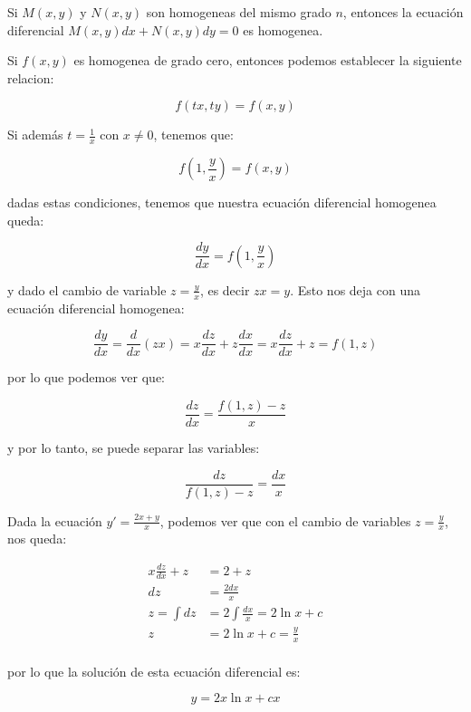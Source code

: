 		\begin{proposicion}
			Si $M(x, y)$ y $N(x, y)$ son homogeneas del mismo grado $n$, entonces la ecuación diferencial $M(x, y) dx + N(x, y) dy = 0$ es homogenea.
		\end{proposicion}

		\begin{proposicion}
			Si $f(x, y)$ es homogenea de grado cero, entonces podemos establecer la siguiente relacion:

			\begin{equation}
				f(tx, ty) = f(x, y)
			\end{equation}

			Si además $t = \frac{1}{x}$ con $x \ne 0$, tenemos que:

			\begin{equation*}
				f(1, \frac{y}{x}) = f(x, y)
			\end{equation*}

			dadas estas condiciones, tenemos que nuestra ecuación diferencial homogenea queda:

			\begin{equation}
				\frac{dy}{dx} = f(1, \frac{y}{x})
			\end{equation}

			y dado el cambio de variable $z = \frac{y}{x}$, es decir $zx = y$. Esto nos deja con una ecuación diferencial homogenea:

			\begin{equation*}
				\frac{dy}{dx} = \frac{d}{dx}(zx) = x \frac{dz}{dx} + z \frac{dx}{dx} = x \frac{dz}{dx} + z = f(1, z)
			\end{equation*}

			por lo que podemos ver que:

			\begin{equation*}
				\frac{dz}{dx} = \frac{f(1, z) - z}{x}
			\end{equation*}

			y por lo tanto, se puede separar las variables:

			\begin{equation}
				\frac{dz}{f(1, z) - z} = \frac{dx}{x}
			\end{equation}
		\end{proposicion}

		\begin{ejemplo}
			Dada la ecuación $y' = \frac{2x + y}{x}$, podemos ver que con el cambio de variables $z  =\frac{y}{x}$, nos queda:

			\begin{align*}
				x \frac{dz}{dx} + z &= 2 + z \\
				dz &= \frac{2dx}{x} \\
				z = \int dz &= 2 \int \frac{dx}{x} = 2 \ln{x} + c \\
				z &= 2 \ln{x} + c = \frac{y}{x} \\
			\end{align*}

			por lo que la solución de esta ecuación diferencial es:

			\begin{equation*}
				y = 2 x \ln{x} + c x
			\end{equation*}
		\end{ejemplo}

